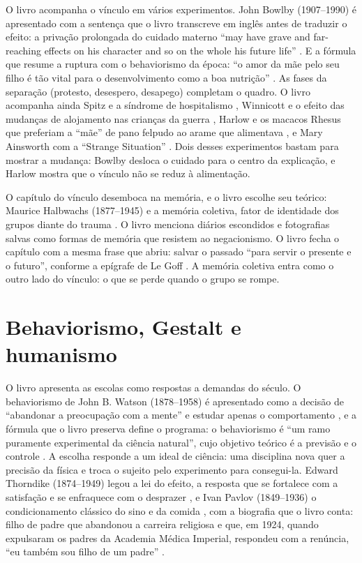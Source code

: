 \documentclass[12pt]{article}
\begin{document}
O livro acompanha o vínculo em vários experimentos. John Bowlby (1907--1990) é apresentado com a sentença que o livro transcreve em inglês antes de traduzir o efeito: a privação prolongada do cuidado materno ``may have grave and far-reaching effects on his character and so on the whole his future life'' \cite[p. 47]{machado}. E a fórmula que resume a ruptura com o behaviorismo da época: ``o amor da mãe pelo seu filho é tão vital para o desenvolvimento como a boa nutrição'' \cite[p. 47]{machado}. As fases da separação (protesto, desespero, desapego) \cite[p. 48]{machado} completam o quadro. O livro acompanha ainda Spitz e a síndrome de hospitalismo \cite[p. 43]{machado}, Winnicott e o efeito das mudanças de alojamento nas crianças da guerra \cite[p. 50]{machado}, Harlow e os macacos Rhesus que preferiam a ``mãe'' de pano felpudo ao arame que alimentava \cite[p. 52]{machado}, e Mary Ainsworth com a ``Strange Situation'' \cite[pp. 109--110]{machado}. Dois desses experimentos bastam para mostrar a mudança: Bowlby desloca o cuidado para o centro da explicação, e Harlow mostra que o vínculo não se reduz à alimentação.

O capítulo do vínculo desemboca na memória, e o livro escolhe seu teórico: Maurice Halbwachs (1877--1945) e a memória coletiva, fator de identidade dos grupos diante do trauma \cite[p. 97]{machado}. O livro menciona diários escondidos e fotografias salvas como formas de memória que resistem ao negacionismo. O livro fecha o capítulo com a mesma frase que abriu: salvar o passado ``para servir o presente e o futuro'', conforme a epígrafe de Le Goff \cite[p. 1]{machado}. A memória coletiva entra como o outro lado do vínculo: o que se perde quando o grupo se rompe.

\section{Behaviorismo, Gestalt e humanismo}

O livro apresenta as escolas como respostas a demandas do século. O behaviorismo de John B. Watson (1878--1958) é apresentado como a decisão de ``abandonar a preocupação com a mente'' e estudar apenas o comportamento \cite[p. 3]{machado}, e a fórmula que o livro preserva define o programa: o behaviorismo é ``um ramo puramente experimental da ciência natural'', cujo objetivo teórico é a previsão e o controle \cite[p. 82]{machado}. A escolha responde a um ideal de ciência: uma disciplina nova quer a precisão da física e troca o sujeito pelo experimento para consegui-la. Edward Thorndike (1874--1949) legou a lei do efeito, a resposta que se fortalece com a satisfação e se enfraquece com o desprazer \cite[p. 111]{machado}, e Ivan Pavlov (1849--1936) o condicionamento clássico do sino e da comida \cite[p. 113]{machado}, com a biografia que o livro conta: filho de padre que abandonou a carreira religiosa e que, em 1924, quando expulsaram os padres da Academia Médica Imperial, respondeu com a renúncia, ``eu também sou filho de um padre'' \cite[p. 67]{machado}.
\end{document}
